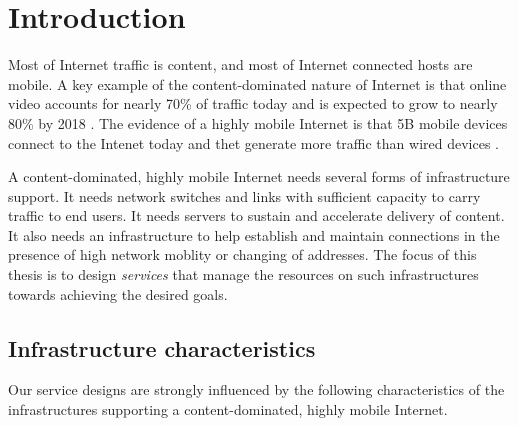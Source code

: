 \chapter{Introduction}

Most of Internet traffic is content, and most of Internet connected hosts are mobile. A key example of the content-dominated nature of Internet is that online video accounts for nearly 70\% of traffic today and is expected to grow to nearly 80\% by 2018 \cite{cisco-videogrowth}. The evidence of a highly mobile Internet is that 5B mobile devices connect to the Intenet today and thet generate more traffic than wired devices \cite{cisco-vni}.


A content-dominated, highly mobile Internet needs several forms of infrastructure support. It needs network switches and links with sufficient capacity to carry traffic to end users. It needs servers to sustain and accelerate delivery of content. It also needs an infrastructure to help establish and maintain connections in the presence of high network moblity or changing of addresses. The focus of this thesis is to design \emph{services} that manage the resources on such infrastructures towards achieving the desired goals.




\section{Infrastructure characteristics}

Our service designs are strongly influenced by the following characteristics of the infrastructures supporting a content-dominated, highly mobile Internet.

